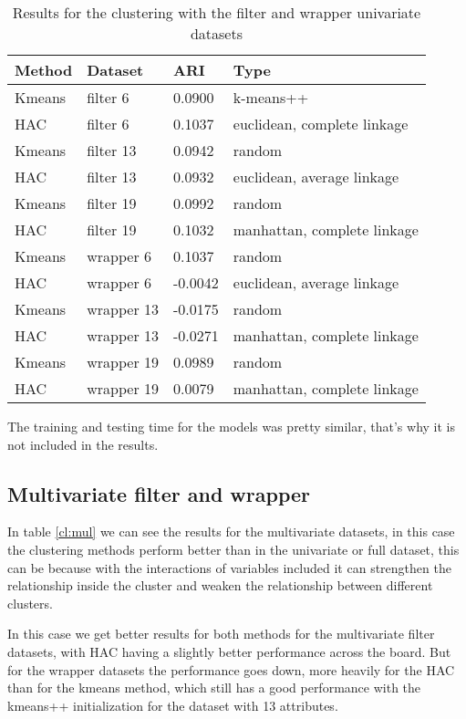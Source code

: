 \documentclass[a4paper,11pt]{article}
\begin{document}
\begin{table}
\centering
\begin{tabular}{|l|l|l|l|}
\hline

\textbf{Method} & \textbf{Dataset} & \textbf{ARI} & \textbf{Type} \\ \hline
Kmeans & filter 6 & 0.0900 & k-means++ \\ \hline
HAC & filter 6 & 0.1037 & euclidean, complete linkage \\ \hline
Kmeans & filter 13 & 0.0942 & random \\ \hline
HAC & filter 13 & 0.0932 & euclidean, average linkage \\ \hline
Kmeans & filter 19 & 0.0992 & random \\ \hline
HAC & filter 19 & 0.1032 & manhattan, complete linkage \\ \hline
Kmeans & wrapper 6 & 0.1037 & random \\ \hline
HAC & wrapper 6 & -0.0042 & euclidean, average linkage \\ \hline
Kmeans & wrapper 13 & -0.0175 & random \\ \hline
HAC & wrapper 13 & -0.0271 & manhattan, complete linkage \\ \hline
Kmeans & wrapper 19 & 0.0989 & random \\ \hline
HAC & wrapper 19 & 0.0079 & manhattan, complete linkage \\ \hline

\end{tabular}
\caption{Results for the clustering with the filter and wrapper univariate datasets}
\label{cl:uni}
\end{table}

The training and testing time for the models was pretty similar, that’s why it is not included in the results.

\subsection{Multivariate filter and wrapper}

In table \ref{cl:mul} we can see the results for the multivariate datasets, in this case the clustering methods perform better than in the univariate or full dataset, this can be because with the interactions of variables included it can strengthen the relationship inside the cluster and weaken the relationship between different clusters.

In this case we get better results for both methods for the multivariate filter datasets, with HAC having a slightly better performance across the board. But for the wrapper datasets the performance goes down, more heavily for the HAC than for the kmeans method, which still has a good performance with the kmeans++ initialization for the dataset with 13 attributes.
\end{document}

